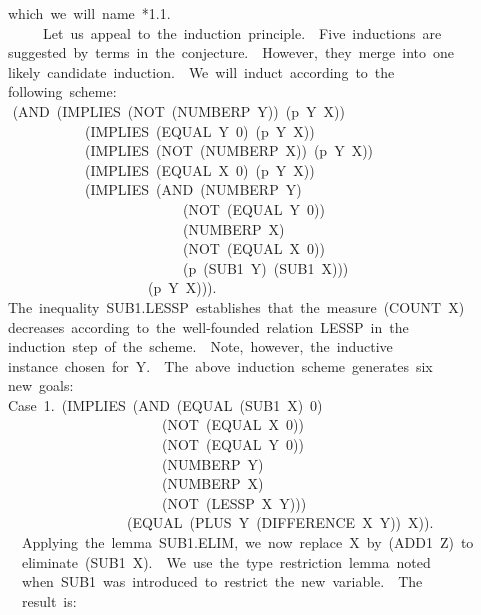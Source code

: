 \documentclass[10pt]{book}
\newenvironment{pubasis}{\begin{flushleft}}{\end{flushleft}}
\begin{document}
\begin{pubasis}
~~which~we~will~name~*1.1.\\

~~~~~~~Let~us~appeal~to~the~induction~principle.~~Five~inductions~are\\
~~suggested~by~terms~in~the~conjecture.~~However,~they~merge~into~one\\
~~likely~candidate~induction.~~We~will~induct~according~to~the\\
~~following~scheme:\\
~~	(AND~(IMPLIES~(NOT~(NUMBERP~Y))~(p~Y~X))\\
~~~~~~~~~~~~~(IMPLIES~(EQUAL~Y~0)~(p~Y~X))\\
~~~~~~~~~~~~~(IMPLIES~(NOT~(NUMBERP~X))~(p~Y~X))\\
~~~~~~~~~~~~~(IMPLIES~(EQUAL~X~0)~(p~Y~X))\\
~~~~~~~~~~~~~(IMPLIES~(AND~(NUMBERP~Y)\\
~~~~~~~~~~~~~~~~~~~~~~~~~~~(NOT~(EQUAL~Y~0))\\
~~~~~~~~~~~~~~~~~~~~~~~~~~~(NUMBERP~X)\\
~~~~~~~~~~~~~~~~~~~~~~~~~~~(NOT~(EQUAL~X~0))\\
~~~~~~~~~~~~~~~~~~~~~~~~~~~(p~(SUB1~Y)~(SUB1~X)))\\
~~~~~~~~~~~~~~~~~~~~~~(p~Y~X))).\\
~~The~inequality~SUB1.LESSP~establishes~that~the~measure~(COUNT~X)\\
~~decreases~according~to~the~well-founded~relation~LESSP~in~the\\
~~induction~step~of~the~scheme.~~Note,~however,~the~inductive\\
~~instance~chosen~for~Y.~~The~above~induction~scheme~generates~six\\
~~new~goals:\\

~~Case~1.~(IMPLIES~(AND~(EQUAL~(SUB1~X)~0)\\
~~~~~~~~~~~~~~~~~~~~~~~~(NOT~(EQUAL~X~0))\\
~~~~~~~~~~~~~~~~~~~~~~~~(NOT~(EQUAL~Y~0))\\
~~~~~~~~~~~~~~~~~~~~~~~~(NUMBERP~Y)\\
~~~~~~~~~~~~~~~~~~~~~~~~(NUMBERP~X)\\
~~~~~~~~~~~~~~~~~~~~~~~~(NOT~(LESSP~X~Y)))\\
~~~~~~~~~~~~~~~~~~~(EQUAL~(PLUS~Y~(DIFFERENCE~X~Y))~X)).\\

~~~~Applying~the~lemma~SUB1.ELIM,~we~now~replace~X~by~(ADD1~Z)~to\\
~~~~eliminate~(SUB1~X).~~We~use~the~type~restriction~lemma~noted\\
~~~~when~SUB1~was~introduced~to~restrict~the~new~variable.~~The\\
~~~~result~is:\\


\end{pubasis}
\end{document}
